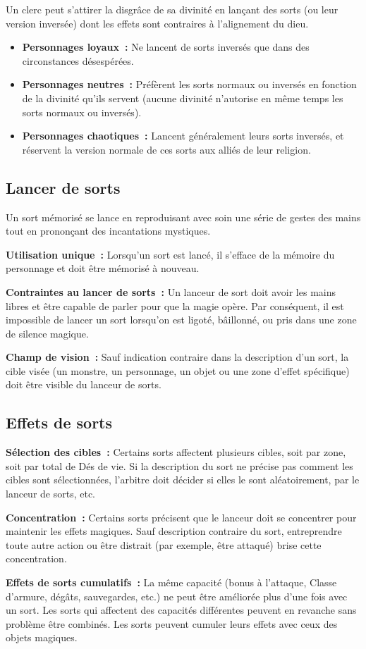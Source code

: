 Un clerc peut s'attirer la disgrâce de sa divinité en lançant des sorts
(ou leur version inversée) dont les effets sont contraires à
l'alignement du dieu.

\begin{itemize}
  \item
  \textbf{Personnages loyaux~:} Ne lancent de sorts inversés que dans
  des circonstances désespérées.
  \item
  \textbf{Personnages neutres~:} Préfèrent les sorts normaux ou inversés
  en fonction de la divinité qu'ils servent (aucune divinité n'autorise
  en même temps les sorts normaux ou inversés).
  \item
  \textbf{Personnages chaotiques~:} Lancent généralement leurs sorts
  inversés, et réservent la version normale de ces sorts aux alliés de
  leur religion.
\end{itemize}

\subsection{Lancer de sorts}\label{lancer-de-sorts}

Un sort mémorisé se lance en reproduisant avec soin une série de gestes
des mains tout en prononçant des incantations mystiques.

\textbf{Utilisation unique~:} Lorsqu'un sort est lancé, il s'efface de
la mémoire du personnage et doit être mémorisé à nouveau.

\textbf{Contraintes au lancer de sorts~:} Un lanceur de sort doit avoir
les mains libres et être capable de parler pour que la magie opère. Par
conséquent, il est impossible de lancer un sort lorsqu'on est ligoté,
bâillonné, ou pris dans une zone de silence magique.

\textbf{Champ de vision~:} Sauf indication contraire dans la description
d'un sort, la cible visée (un monstre, un personnage, un objet ou une
zone d'effet spécifique) doit être visible du lanceur de sorts.

\subsection{Effets de sorts}\label{effets-de-sorts}

\textbf{Sélection des cibles~:} Certains sorts affectent plusieurs
cibles, soit par zone, soit par total de Dés de vie. Si la description
du sort ne précise pas comment les cibles sont sélectionnées, l'arbitre
doit décider si elles le sont aléatoirement, par le lanceur de sorts,
etc.

\textbf{Concentration~:} Certains sorts précisent que le lanceur doit se
concentrer pour maintenir les effets magiques. Sauf description
contraire du sort, entreprendre toute autre action ou être distrait (par
exemple, être attaqué) brise cette concentration.

\textbf{Effets de sorts cumulatifs~:} La même capacité (bonus à l'attaque, Classe d'armure, dégâts,
sauvegardes, etc.) ne peut être améliorée plus d'une fois avec un sort. Les sorts qui affectent des
capacités différentes peuvent en revanche sans problème être combinés.
Les sorts peuvent cumuler leurs effets avec ceux des objets magiques.
